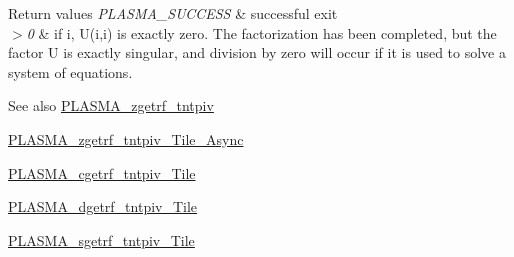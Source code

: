 \begin{DoxyRetVals}{Return values}
{\em P\+L\+A\+S\+M\+A\+\_\+\+S\+U\+C\+C\+E\+S\+S} & successful exit \\
\hline
{\em $>$0} & if i, U(i,i) is exactly zero. The factorization has been completed, but the factor U is exactly singular, and division by zero will occur if it is used to solve a system of equations.\\
\hline
\end{DoxyRetVals}
\begin{DoxySeeAlso}{See also}
\hyperlink{group__PLASMA__Complex64__t_ga9ab8aca11b7dadc50bcb9dea67cd4954_ga9ab8aca11b7dadc50bcb9dea67cd4954}{P\+L\+A\+S\+M\+A\+\_\+zgetrf\+\_\+tntpiv} 

\hyperlink{group__PLASMA__Complex64__t__Tile__Async_ga42dd20197a45760bcccf94657b581050_ga42dd20197a45760bcccf94657b581050}{P\+L\+A\+S\+M\+A\+\_\+zgetrf\+\_\+tntpiv\+\_\+\+Tile\+\_\+\+Async} 

\hyperlink{group__PLASMA__Complex32__t__Tile_gad2c4161f8dc22dd19f541fd91a402c0d_gad2c4161f8dc22dd19f541fd91a402c0d}{P\+L\+A\+S\+M\+A\+\_\+cgetrf\+\_\+tntpiv\+\_\+\+Tile} 

\hyperlink{group__double__Tile_ga9705a219e533b0fc94698872f67411b0_ga9705a219e533b0fc94698872f67411b0}{P\+L\+A\+S\+M\+A\+\_\+dgetrf\+\_\+tntpiv\+\_\+\+Tile} 

\hyperlink{group__float__Tile_gae07b9e0af4e3d12491dfe0a2cc6eef31_gae07b9e0af4e3d12491dfe0a2cc6eef31}{P\+L\+A\+S\+M\+A\+\_\+sgetrf\+\_\+tntpiv\+\_\+\+Tile} 
\end{DoxySeeAlso}
\hypertarget{group__PLASMA__Complex64__t__Tile_ga7da186dd28a5bd5551d4c18ebb8e38ea_ga7da186dd28a5bd5551d4c18ebb8e38ea}{}
